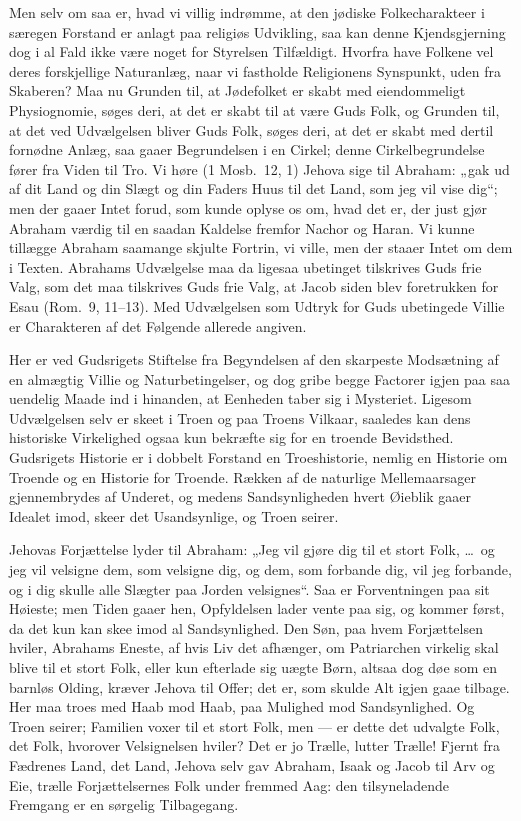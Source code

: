 \documentclass[12pt]{book}
\begin{document}
Men selv om saa er, hvad vi villig indrømme, at den jødiske
Folkecharakteer i særegen Forstand er anlagt paa religiøs Udvikling,
saa kan denne Kjendsgjerning dog i al Fald ikke være noget for
Styrelsen Tilfældigt. Hvorfra have Folkene vel deres forskjellige
Naturanlæg, naar vi fastholde Religionens Synspunkt, uden fra
Skaberen? Maa nu Grunden til, at Jødefolket er skabt med
eiendommeligt Physiognomie, søges deri, at det er skabt til at være
Guds Folk, og Grunden til, at det ved Udvælgelsen bliver Guds Folk,
søges deri, at det er skabt med dertil fornødne Anlæg, saa gaaer
Begrundelsen i en Cirkel; denne Cirkelbegrundelse fører fra Viden
til Tro. Vi høre (1 Mosb.\ 12, 1) Jehova sige til Abraham: „gak ud
af dit Land og din Slægt og din Faders Huus til det Land,
som jeg vil vise dig“; men der gaaer Intet forud, som kunde oplyse
os om, hvad det er, der just gjør Abraham værdig til en saadan
Kaldelse fremfor Nachor og Haran. Vi kunne tillægge Abraham
saamange skjulte Fortrin, vi ville, men der staaer Intet om dem i
Texten. Abrahams Udvælgelse maa da ligesaa ubetinget tilskrives Guds
frie Valg, som det maa tilskrives Guds frie Valg, at Jacob siden
blev foretrukken for Esau (Rom.\ 9, 11--13). Med Udvælgelsen som
Udtryk for Guds ubetingede Villie er Charakteren af det Følgende
allerede angiven.

Her er ved Gudsrigets Stiftelse fra Begyndelsen af den skarpeste
Modsætning af en almægtig Villie og Naturbetingelser, og dog gribe
begge Factorer igjen paa saa uendelig Maade ind i hinanden, at
Eenheden taber sig i Mysteriet. Ligesom Udvælgelsen selv er skeet i
Troen og paa Troens Vilkaar, saaledes kan dens historiske
Virkelighed ogsaa kun bekræfte sig for en troende Bevidsthed.
Gudsrigets Historie er i dobbelt Forstand en Troeshistorie, nemlig
en Historie om Troende og en Historie for Troende. Rækken af de
naturlige Mellemaarsager gjennembrydes af Underet, og medens
Sandsynligheden hvert Øieblik gaaer Idealet imod, skeer det
Usandsynlige, og Troen seirer.

Jehovas Forjættelse lyder til Abraham: „Jeg vil gjøre dig til et
stort Folk, \dots\ og jeg vil velsigne dem, som velsigne dig, og
dem, som forbande dig, vil jeg forbande, og i dig skulle alle
Slægter paa Jorden velsignes“. Saa er Forventningen paa sit
Høieste; men Tiden gaaer hen, Opfyldelsen lader vente paa sig, og
kommer først, da det kun kan skee imod al Sandsynlighed. Den Søn,
paa hvem Forjættelsen hviler, Abrahams Eneste, af hvis Liv det
afhænger, om Patriarchen virkelig skal blive til et stort Folk,
eller kun efterlade sig uægte Børn, altsaa dog døe som en barnløs
Olding, kræver Jehova til Offer;
det er, som skulde Alt igjen gaae tilbage. Her maa troes med Haab
mod Haab, paa Mulighed mod Sandsynlighed. Og Troen seirer; Familien
voxer til et stort Folk, men --- er dette det udvalgte Folk, det
Folk, hvorover Velsignelsen hviler? Det er jo Trælle, lutter Trælle!
Fjernt fra Fædrenes Land, det Land, Jehova selv gav Abraham, Isaak
og Jacob til Arv og Eie, trælle Forjættelsernes Folk under fremmed
Aag: den tilsyneladende Fremgang er en sørgelig Tilbagegang.
\end{document}
